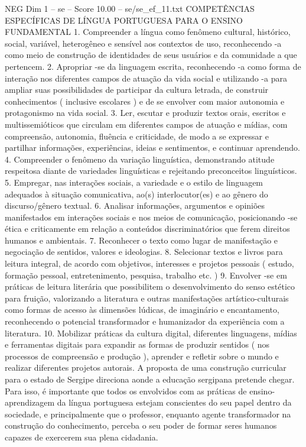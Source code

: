 \begin{textsample}{NEG Dim 1 – se – Score 10.00 – se/se\_ef\_11.txt}  \label{ex:f1_neg_210}
COMPETÊNCIAS ESPECÍFICAS DE LÍNGUA PORTUGUESA PARA O ENSINO FUNDAMENTAL 1.
Compreender a língua como fenômeno cultural, histórico, social, variável, heterogêneo e sensível aos contextos de uso, reconhecendo -a como meio de construção de identidades de seus usuários e da comunidade a que pertencem. 2.
Apropriar -se da linguagem escrita, reconhecendo -a como forma de interação nos diferentes campos de atuação da vida social e utilizando -a para ampliar suas possibilidades de participar da cultura letrada, de construir conhecimentos ( inclusive escolares ) e de se envolver com maior autonomia e protagonismo na vida social. 3.
Ler, escutar e produzir textos orais, escritos e multissemióticos que circulam em diferentes campos de atuação e mídias, com compreensão, autonomia, fluência e criticidade, de modo a se expressar e partilhar informações, experiências, ideias e sentimentos, e continuar aprendendo. 4.
Compreender o fenômeno da variação linguística, demonstrando atitude respeitosa diante de variedades linguísticas e rejeitando preconceitos linguísticos. 5.
Empregar, nas interações sociais, a variedade e o estilo de linguagem adequados à situação comunicativa, ao(s) interlocutor(es) e ao gênero do discurso/gênero textual. 6.
Analisar informações, argumentos e opiniões manifestados em interações sociais e nos meios de comunicação, posicionando -se ética e criticamente em relação a conteúdos discriminatórios que ferem direitos humanos e ambientais. 7.
Reconhecer o texto como lugar de manifestação e negociação de sentidos, valores e ideologias. 8.
Selecionar textos e livros para leitura integral, de acordo com objetivos, interesses e projetos pessoais ( estudo, formação pessoal, entretenimento, pesquisa, trabalho etc. ) 9.
Envolver -se em práticas de leitura literária que possibilitem o desenvolvimento do senso estético para fruição, valorizando a literatura e outras manifestações artístico-culturais como formas de acesso às dimensões lúdicas, de imaginário e encantamento, reconhecendo o potencial transformador e humanizador da experiência com a literatura. 10.
Mobilizar práticas da cultura digital, diferentes linguagens, mídias e ferramentas digitais para expandir as formas de produzir sentidos ( nos processos de compreensão e produção ), aprender e refletir sobre o mundo e realizar diferentes projetos autorais.
A proposta de uma construção curricular para o estado de Sergipe direciona aonde a educação sergipana pretende chegar.
Para isso, é importante que todos os envolvidos com as práticas de ensino-aprendizagem da língua portuguesa estejam conscientes do seu papel dentro da sociedade, e principalmente que o professor, enquanto agente transformador na construção do conhecimento, perceba o seu poder de formar seres humanos capazes de exercerem sua plena cidadania.

\end{textsample}
